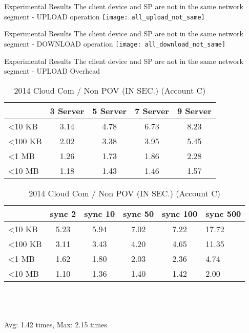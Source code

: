 \begin{frame}{Experimental Results}
{The client device and SP are \alert{not} in the same network segment - UPLOAD operation}
	\texttt{[image: all\_upload\_not\_same]}
\end{frame}

\begin{frame}{Experimental Results}
{The client device and SP are \alert{not} in the same network segment - DOWNLOAD operation}
	\texttt{[image: all\_download\_not\_same]}
\end{frame}

\begin{frame}{Experimental Results}
{The client device and SP are \alert{not} in the same network segment - UPLOAD Overhead}
	\scriptsize
    \begin{table}[]
    \centering
    \caption{My Method / Non POV (IN SEC.) (Account C)}
    \begin{tabular}{lcccc}
                         & 3 Server & 5 Server & 7 Server & 9 Server \\ \hline
        \textless 10 KB  & 3.14 & 4.78 & 6.73 & 8.23 \\ \hline
        \textless 100 KB & 2.02 & 3.38 & 3.95 & 5.45 \\ \hline
        \textless 1 MB   & 1.26 & 1.73 & 1.86 & 2.28 \\ \hline
        \textless 10 MB  & 1.18 & 1.43 & 1.46 & 1.57 \\ \hline
    \end{tabular}
    \caption{2014 Cloud Com / Non POV (IN SEC.) (Account C)}
    \begin{tabular}{lccccl}
                         & sync 2   & sync 10  & sync 50  & sync 100 & sync 500 \\ \hline
        \textless 10 KB  & 5.23 & 5.94 & 7.02 & 7.22   & 17.72  \\ \hline
        \textless 100 KB & 3.11 & 3.43 & 4.20 & 4.65   & 11.35  \\ \hline
        \textless 1 MB   & 1.62 & 1.80 & 2.03 & 2.36   & 4.74   \\ \hline
        \textless 10 MB  & 1.10 & 1.36 & 1.40 & 1.42   & 2.00   \\ \hline
    \end{tabular}
    ~\\
    ~\\
    ~\\
    \alert{Avg: 1.42 times, Max: 2.15 times}
    \end{table}
\end{frame}


